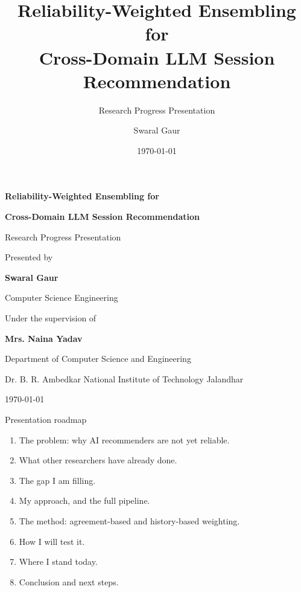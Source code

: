 \documentclass[aspectratio=169,12pt]{beamer}
\title[RWRA for Cross-Domain LLM SR]{Reliability-Weighted Ensembling for\\Cross-Domain LLM Session Recommendation}
\subtitle{Research Progress Presentation}
\author{Swaral Gaur}
\institute{Computer Science Engineering / Dr. B. R. Ambedkar National Institute of Technology Jalandhar}
\date{\today}
\begin{document}
\begin{frame}[plain]
\centering
\vspace{0.5cm}
{\color{DeepBlue}\bfseries\LARGE
Reliability-Weighted Ensembling for\par}
{\color{DeepBlue}\bfseries\LARGE
Cross-Domain LLM Session Recommendation\par}
\vspace{0.4cm}
{\color{Muted}\large Research Progress Presentation\par}
\vfill
{\normalsize Presented by\par}
\vspace{0.1cm}
{\large\bfseries Swaral Gaur\par}
{\normalsize Computer Science Engineering\par}
\vspace{0.4cm}
{\normalsize Under the supervision of\par}
\vspace{0.1cm}
{\large\bfseries Mrs. Naina Yadav\par}
{\normalsize Department of Computer Science and Engineering\par}
\vspace{0.4cm}
{\normalsize Dr. B. R. Ambedkar National Institute of Technology Jalandhar\par}
\vspace{0.15cm}
{\normalsize \today\par}
\end{frame}

\begin{frame}{Presentation roadmap}
\begin{enumerate}
  \item The problem: why AI recommenders are not yet reliable.
  \item What other researchers have already done.
  \item The gap I am filling.
  \item My approach, and the full pipeline.
  \item The method: agreement-based and history-based weighting.
  \item How I will test it.
  \item Where I stand today.
  \item Conclusion and next steps.
\end{enumerate}
\end{frame}
\end{document}

